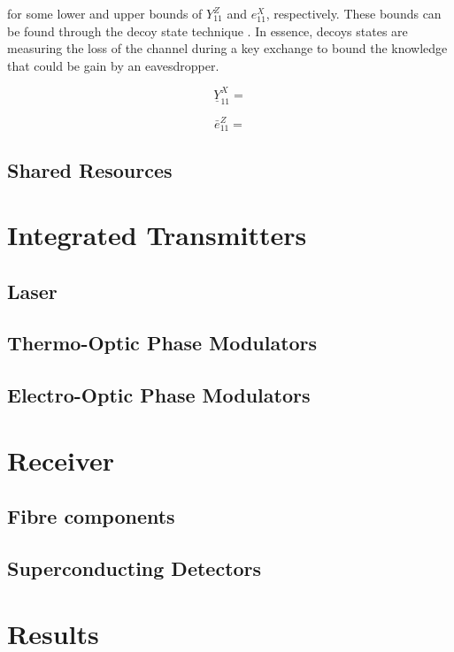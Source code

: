 for some lower and upper bounds of $Y_{11}^Z$ and $e_{11}^X$, respectively. These bounds can be found through the decoy state technique \cite{}. In essence, decoys states are measuring the loss of the channel during a key exchange to bound the knowledge that could be gain by an eavesdropper. 

\begin{equation}
	\underline{Y}_{11}^X = 
\end{equation}

\begin{equation}
	\bar{e}_{11}^Z = 
\end{equation}

\subsection{Shared Resources}

\section{Integrated Transmitters}

\subsection{Laser}

\subsection{Thermo-Optic Phase Modulators}

\subsection{Electro-Optic Phase Modulators}

\section{Receiver}

\subsection{Fibre components}

\subsection{Superconducting Detectors}

\section{Results}

